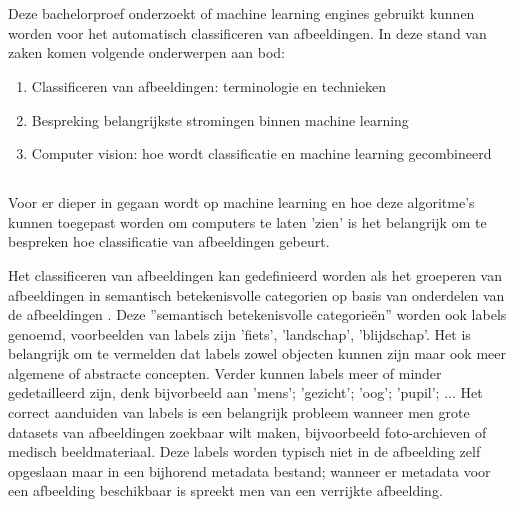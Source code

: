\chapter{}
\label{ch:stand-van-zaken}


\section{}
\label{sec:standvanzaken-inleiding}

Deze bachelorproef onderzoekt of machine learning engines gebruikt kunnen worden voor het automatisch classificeren van afbeeldingen. In deze stand van zaken komen volgende onderwerpen aan bod:
\begin{enumerate}
    \item Classificeren van afbeeldingen: terminologie en technieken
    \item Bespreking belangrijkste stromingen binnen machine learning
    \item Computer vision: hoe wordt classificatie en machine learning gecombineerd
\end{enumerate}

\section{}
\label{sec:classificeren-van-afbeeldingen}
Voor er dieper in gegaan wordt op machine learning en hoe deze algoritme's kunnen toegepast worden om computers te laten 'zien' is het belangrijk om te bespreken hoe classificatie van afbeeldingen gebeurt.

Het classificeren van afbeeldingen kan gedefinieerd worden als het groeperen van afbeeldingen in semantisch betekenisvolle categorien op basis van onderdelen van de afbeeldingen \autocite{Vailaya1998}. Deze ''semantisch betekenisvolle categorieën'' worden ook labels genoemd, voorbeelden van labels zijn 'fiets', 'landschap', 'blijdschap'. Het is belangrijk om te vermelden dat labels zowel objecten kunnen zijn maar ook meer algemene of abstracte concepten. Verder kunnen labels meer of minder gedetailleerd zijn, denk bijvorbeeld aan 'mens'; 'gezicht'; 'oog'; 'pupil'; ... Het correct aanduiden van labels is een belangrijk probleem wanneer men grote datasets van afbeeldingen zoekbaar wilt maken, bijvoorbeeld foto-archieven of medisch beeldmateriaal. Deze labels worden typisch niet in de afbeelding zelf opgeslaan maar in een bijhorend metadata bestand; wanneer er metadata voor een afbeelding beschikbaar is spreekt men van een verrijkte afbeelding.


